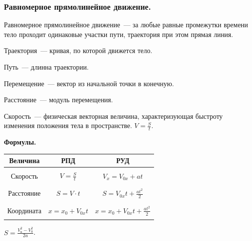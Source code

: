 \documentclass{article}
\begin{document}
	\subsubsection{Равномерное прямолинейное движение.}
	\begin{definition}
		Равномерное прямолинейное движение~--- за любые равные промежутки времени тело проходит одинаковые участки пути, траектория при этом прямая линия.
	\end{definition}
	\begin{definition}
		Траектория~--- кривая, по которой движется тело.
	\end{definition}
	\begin{definition}
		Путь~--- длинна траектории.
	\end{definition}
	\begin{definition}
		Перемещение~--- вектор из начальной точки в конечную.
	\end{definition}
	\begin{definition}
		Расстояние~--- модуль перемещения.
	\end{definition}
	\begin{definition}
		Скорость~--- физическая векторная величина, характеризующая быстроту изменения положения тела в пространстве. $V = \frac{S}{t}$.
	\end{definition}
	\noindent
	\textbf{Формулы.} \\
	\begin{tabular}{|c|c|c|}
		\hline
		\textbf{Величина} & \textbf{РПД} & \textbf{РУД} \\
		\hline
		 & & \\
		Скорость & $V = \frac{S}{t}$ & $V_x = V_{0x} + at$ \\
		 & & \\
		\hline
		 & & \\
		Расстояние & $S = V \cdot t$ & $S = V_{0x}t + \frac{at^2}{2}$ \\
		 & & \\
		\hline
		 & & \\
		Координата & $x = x_0 + V_{0x}t$ & $x = x_0 + V_{0x}t + \frac{at^2}{2}$ \\
		 & & \\
		\hline
	\end{tabular}
	\begin{statement}
		$S = \frac{V_{\text{к}}^2 - V_0^2}{2a}$.
	\end{statement}
\end{document}
